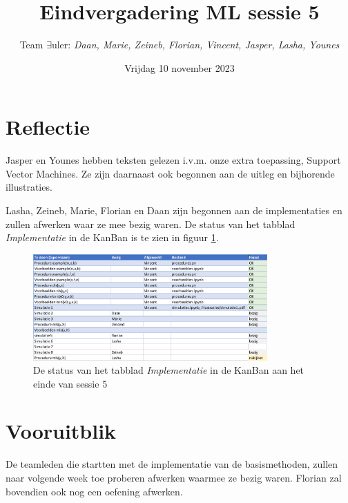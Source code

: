 \documentclass{article}
\title{Eindvergadering ML sessie 5}
\author{Team $\exists$uler: \textit{Daan, Marie, Zeineb, Florian, Vincent, Jasper, Lasha, Younes}}
\date{Vrijdag 10 november 2023}
\begin{document}
	
\maketitle

\section*{Reflectie}

Jasper en Younes hebben teksten gelezen i.v.m. onze extra toepassing, Support Vector Machines. Ze zijn daarnaast ook begonnen aan de uitleg en bijhorende illustraties.

 Lasha, Zeineb, Marie, Florian en Daan zijn begonnen aan de implementaties en zullen afwerken waar ze mee bezig waren. De status van het tabblad \textit{Implementatie} in de KanBan is te zien in figuur \ref{fig:kanban}.
 
\begin{figure}
	\centering
	\includegraphics[width=0.8\textwidth]{kanban_einde}
	\caption{De status van het tabblad \textit{Implementatie} in de KanBan aan het einde van sessie 5}
	\label{fig:kanban}
\end{figure}

\section*{Vooruitblik}

De teamleden die startten met de implementatie van de basismethoden, zullen naar volgende week toe proberen afwerken waarmee ze bezig waren. Florian zal bovendien ook nog een oefening afwerken.
\end{document}
